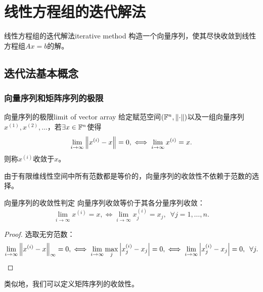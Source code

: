 \chapter{线性方程组的迭代解法}

\begin{definition}
    {线性方程组的迭代解法}{iterative method}
    构造一个向量序列，使其尽快收敛到线性方程组$Ax=b$的解。
\end{definition}

\section{迭代法基本概念}

\subsection{向量序列和矩阵序列的极限}

\begin{definition}
    {向量序列的极限}{limit of vector array}
    给定赋范空间$(\mathbb F^n,\left\lVert\cdot\right\rVert)$以及一组向量序列$x^{(1)},x^{(2)},\ldots$，若$\exists x\in\mathbb F^n$使得
    \begin{equation}
        \lim_{i\to\infty}\left\lVert x^{(i)}-x\right\rVert=0,\iff\lim_{i\to\infty}x^{(i)}=x.
    \end{equation}
    则称$x^{(i)}$收敛于$x$。
\end{definition}

\begin{remark}
    由于有限维线性空间中所有范数都是等价的，向量序列的收敛性不依赖于范数的选择。
\end{remark}

\begin{theorem}
    {向量序列的收敛性判定}{}
    向量序列收敛等价于其各分量序列收敛：
    \begin{equation}
        \lim_{i\to\infty}x^{(i)}=x,\iff\lim_{i\to\infty}x^{(i)}_j=x_j,\enspace \forall j=1,\ldots,n.
    \end{equation}
\end{theorem}

\begin{proof}
    选取无穷范数：
    \[
        \lim_{i\to\infty}\left\lVert x^{(i)}-x\right\rVert_\infty=0,\iff\lim_{i\to\infty}\max_j\left\lvert x^{(i)}_j-x_j\right\rvert=0,\iff\lim_{i\to\infty}\left\lvert x^{(i)}_j-x_j\right\rvert=0,\enspace\forall j.
        \qedhere
    \]
\end{proof}

\begin{remark}
    类似地，我们可以定义矩阵序列的收敛性。
\end{remark}

